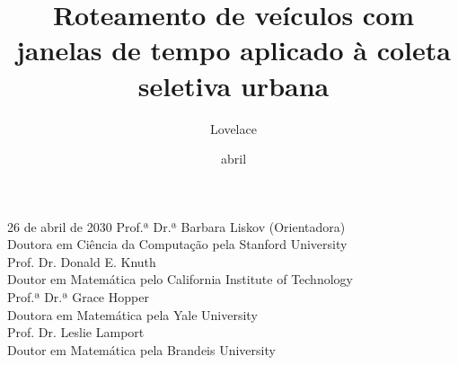 \documentclass[tese,capa]{texufpel}
\title{Roteamento de veículos com janelas de tempo aplicado à coleta seletiva urbana}
\author{Lovelace}{Ada}                          %
\date{abril}{2030}
\begin{document}
\renewcommand{\advisorname}{Orientadora}

\maketitle   %

\fichacatalografica


\begin{aprovacao}{26 de abril de 2030}
\noindent Prof.ª Dr.ª Barbara Liskov (Orientadora)\\
Doutora em Ciência da Computação pela Stanford University\\[1cm]

\noindent Prof. Dr. Donald E. Knuth\\
Doutor em Matemática pelo California Institute of Technology\\[1cm]

\noindent Prof.ª Dr.ª Grace Hopper\\
Doutora em Matemática pela Yale University\\[1cm]

\noindent Prof. Dr. Leslie Lamport\\
Doutor em Matemática pela Brandeis University
\end{aprovacao}
\end{document}
